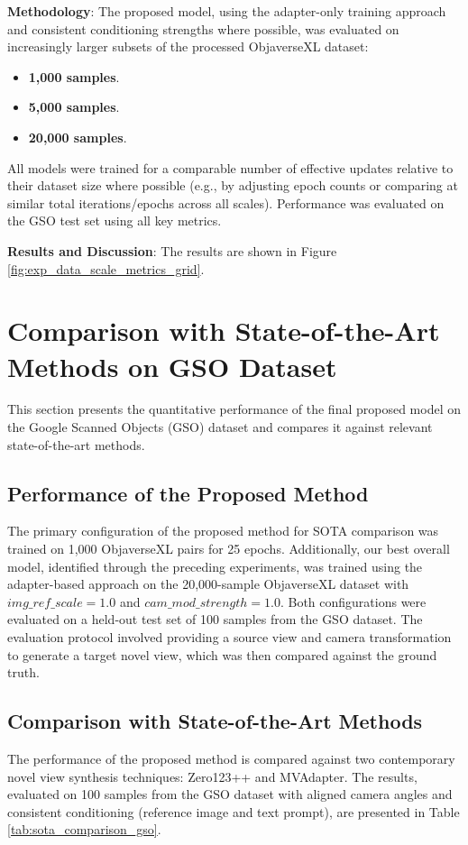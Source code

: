 \textbf{Methodology}:
The proposed model, using the adapter-only training approach and consistent conditioning strengths where possible, was evaluated on increasingly larger subsets of the processed ObjaverseXL dataset:
\begin{itemize}
  \item \textbf{1,000 samples}.
  \item \textbf{5,000 samples}.
  \item \textbf{20,000 samples}.
\end{itemize}
All models were trained for a comparable number of effective updates relative to their dataset size where possible (e.g., by adjusting epoch counts or comparing at similar total iterations/epochs across all scales). Performance was evaluated on the GSO test set using all key metrics.

\textbf{Results and Discussion}: The results are shown in Figure \ref{fig:exp_data_scale_metrics_grid}. 

\section{Comparison with State-of-the-Art Methods on GSO Dataset}\label{sec:exp_gso_quantitative_sota}

This section presents the quantitative performance of the final proposed model on the Google Scanned Objects (GSO) dataset and compares it against relevant state-of-the-art methods.

\subsection{Performance of the Proposed Method}\label{ssec:exp_gso_our_model}
The primary configuration of the proposed method for SOTA comparison was trained on 1,000 ObjaverseXL pairs for 25 epochs. Additionally, our best overall model, identified through the preceding experiments, was trained using the adapter-based approach on the 20,000-sample ObjaverseXL dataset with $img\_ref\_scale=1.0$ and $cam\_mod\_strength=1.0$. Both configurations were evaluated on a held-out test set of 100 samples from the GSO dataset. The evaluation protocol involved providing a source view and camera transformation to generate a target novel view, which was then compared against the ground truth.

\subsection{Comparison with State-of-the-Art Methods}\label{ssec:exp_sota_comparison}
The performance of the proposed method is compared against two contemporary novel view synthesis techniques: Zero123++ and MVAdapter. The results, evaluated on 100 samples from the GSO dataset with aligned camera angles and consistent conditioning (reference image and text prompt), are presented in Table \ref{tab:sota_comparison_gso}.

